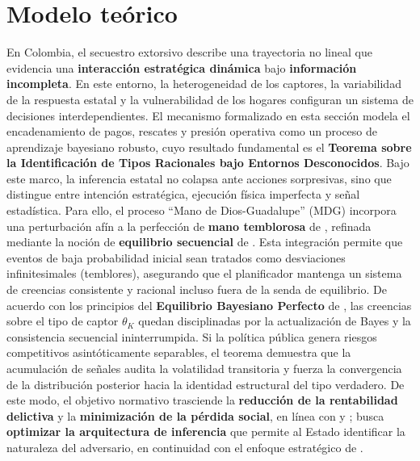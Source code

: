 \documentclass[12pt]{article}
\providecommand{\textcite}{\citet}
\theoremstyle{definition}
\theoremstyle{remark}
\newcommand{\1}{\mathbf{1}}
\begin{document}
\section{Modelo teórico}
\label{sec:model}
\label{sec:introduccion-mechanism}
\noindent En Colombia, el secuestro extorsivo describe una trayectoria no lineal que evidencia una \textbf{interacción estratégica dinámica} bajo \textbf{información incompleta}. En este entorno, la heterogeneidad de los captores, la variabilidad de la respuesta estatal y la vulnerabilidad de los hogares configuran un sistema de decisiones interdependientes. El mecanismo formalizado en esta sección modela el encadenamiento de pagos, rescates y presión operativa como un proceso de aprendizaje bayesiano robusto, cuyo resultado fundamental es el \textbf{Teorema sobre la Identificación de Tipos Racionales bajo Entornos Desconocidos}. Bajo este marco, la inferencia estatal no colapsa ante acciones sorpresivas, sino que distingue entre intención estratégica, ejecución física imperfecta y señal estadística. Para ello, el proceso ``Mano de Dios-Guadalupe'' (MDG) incorpora una perturbación afín a la perfección de \textbf{mano temblorosa} de \textcite{Selten1975Perfectness}, refinada mediante la noción de \textbf{equilibrio secuencial} de \textcite{KrepsWilson1982}. Esta integración permite que eventos de baja probabilidad inicial sean tratados como desviaciones infinitesimales (temblores), asegurando que el planificador mantenga un sistema de creencias consistente y racional incluso fuera de la senda de equilibrio. De acuerdo con los principios del \textbf{Equilibrio Bayesiano Perfecto} de \textcite{FudenbergTirole1991}, las creencias sobre el tipo de captor $\theta_K$ quedan disciplinadas por la actualización de Bayes y la consistencia secuencial ininterrumpida. Si la política pública genera riesgos competitivos asintóticamente separables, el teorema demuestra que la acumulación de señales audita la volatilidad transitoria y fuerza la convergencia de la distribución posterior hacia la identidad estructural del tipo verdadero. De este modo, el objetivo normativo trasciende la \textbf{reducción de la rentabilidad delictiva} y la \textbf{minimización de la pérdida social}, en línea con \textcite{Becker1968} y \textcite{Mejia2000Secuestro}; busca \textbf{optimizar la arquitectura de inferencia} que permite al Estado identificar la naturaleza del adversario, en continuidad con el enfoque estratégico de \textcite{Selten1977Kidnapping}.
\label{sec:formal-mecanismo}
\label{sec:forma-juego}
\label{sec:types}
\end{document}

